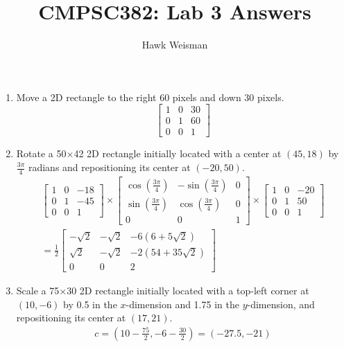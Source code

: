 \documentclass[a4paper,12pt]{article}
\title{CMPSC382: Lab 3 Answers}
\author{Hawk Weisman}
\begin{document}
\maketitle
\begin{enumerate}
    \item Move a 2D rectangle to the right 60 pixels and down 30 pixels. \\
    \[\begin{bmatrix}
        1 & 0 & 30 \\
        0 & 1 & 60 \\
        0 & 0 & 1
    \end{bmatrix}\]
    \item Rotate a 50$\times$42 2D rectangle initially located with a center at $(45, 18)$ by $\frac{3\pi}{4}$ radians and repositioning its center at $(-20, 50)$.
    \begin{gather*}
    \begin{bmatrix}
        1 & 0 & -18\\
        0 & 1 & -45\\
        0 & 0 & 1
    \end{bmatrix}
    \times
    \begin{bmatrix}
        \cos(\frac{3\pi}{4}) & -\sin(\frac{3\pi}{4}) & 0 \\
        \sin(\frac{3\pi}{4}) & \cos(\frac{3\pi}{4}) & 0 \\
        0 & 0 & 1
    \end{bmatrix}
    \times
    \begin{bmatrix}
        1 & 0 & -20 \\
        0 & 1 & 50 \\
        0 & 0 & 1
    \end{bmatrix}\\
    =\frac{1}{2}
    \begin{bmatrix}
        -\sqrt{2} & -\sqrt{2} & -6(6 + 5\sqrt{2}) \\
        \sqrt{2} & -\sqrt{2} & -2(54 + 35\sqrt{2}) \\
        0 & 0 & 2
    \end{bmatrix}
    \end{gather*}
    \item Scale a 75$\times$30 2D rectangle initially located with a top-left corner at $(10, -6)$ by 0.5 in the $x$-dimension and 1.75 in the $y$-dimension, and repositioning its center at $(17, 21)$.
    \begin{gather*}
        c = (10 - \frac{75}{2}, -6 - \frac{30}{2}) = (-27.5, -21)\\

\end{gather*}
\end{enumerate}
\end{document}
